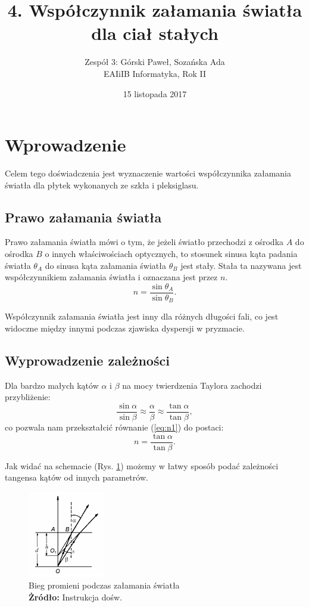 \documentclass[12pt,a4paper]{article}
\title{4. Współczynnik załamania światła\\ dla ciał stałych}
\date{15 listopada 2017}
\author{
	Zespół 3: Górski Paweł, Sozańska Ada\\
	EAIiIB Informatyka, Rok II
}
\numberwithin{equation}{section}
\newcommand*{\captionsource}[2]{%
	\caption[{#1}]{%
		#1%
		\\\hspace{\linewidth}%
		\textbf{Żródło:} #2%
	}%
}
\begin{document}
\maketitle
\section{Wprowadzenie}
Celem tego doświadczenia jest wyznaczenie wartości współczynnika załamania światła dla płytek wykonanych ze szkła i pleksiglasu.

\subsection{Prawo załamania światła}

Prawo załamania światła mówi o tym, że jeżeli światło przechodzi z ośrodka $A$ do ośrodka $B$ o innych właściwościach optycznych, to stosunek sinusa kąta padania światła $\theta_A$ do sinusa kąta załamania światła $\theta_B$ jest stały. Stała ta nazywana jest współczynnikiem załamania światła i oznaczana jest przez $n$.
\begin{equation}
	n = \frac{\sin \theta_A}{\sin \theta_B}.
	\label{eq:n1}
\end{equation}

Współczynnik załamania światła jest inny dla różnych długości fali, co jest widoczne między innymi podczas zjawiska dyspersji w pryzmacie.

\subsection{Wyprowadzenie zależności}

Dla bardzo małych kątów $\alpha$ i $\beta$ na mocy twierdzenia Taylora zachodzi przybliżenie:
\begin{equation}
	\frac{\sin \alpha}{\sin \beta} \approx \frac{\alpha}{\beta} \approx \frac{\tan \alpha}{\tan \beta},
\end{equation}
co pozwala nam przekształcić równanie (\ref{eq:n1}) do postaci:
\begin{equation}
	n = \frac{\tan \alpha}{\tan \beta}.
\end{equation}

Jak widać na schemacie (Rys. \ref{fig:img1}) możemy w łatwy sposób podać zależności tangensa kątów od innych parametrów.


\begin{figure}
	\centering
	\includegraphics[width=0.3\textwidth]{img/swiatlo.png} 
	\captionsource{Bieg promieni podczas załamania światła}{Instrukcja dośw.\\}
	\label{fig:img1}
\end{figure}
\end{document}
